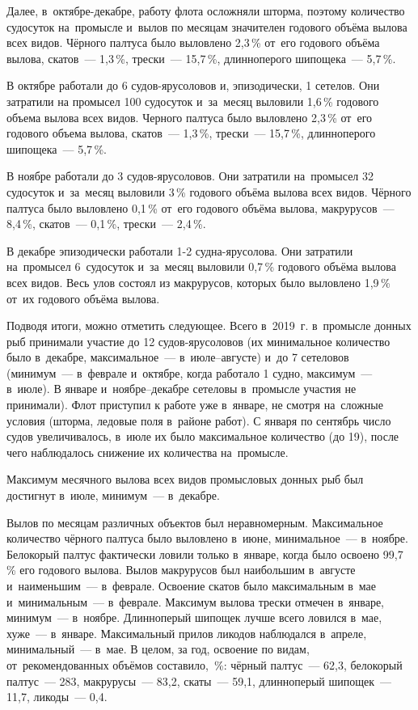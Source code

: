 Далее, в~октябре-декабре, работу флота осложняли шторма, поэтому количество судосуток на~промысле и~вылов по месяцам значителен годового объёма вылова всех видов. Чёрного палтуса было выловлено 2,3\,\% от~его годового объёма вылова, скатов~--- 1,3\,\%, трески~--- 15,7\,\%, длинноперого шипощека~--- 5,7\,\%.

В октябре работали до 6 судов-ярусоловов и, эпизодически, 1 сетелов. Они затратили на промысел 100 судосуток и~за~месяц выловили 1,6\,\% годового объема вылова всех видов. Черного палтуса было выловлено 2,3\,\% от~его годового объема вылова, скатов~--- 1,3\,\%, трески~--- 15,7\,\%, длинноперого шипощека~--- 5,7\,\%.

В ноябре работали до 3 судов-ярусоловов. Они затратили на~промысел 32 судосуток и~за~месяц выловили 3\,\% годового объёма вылова всех видов. Чёрного палтуса было выловлено 0,1\,\% от~его годового объёма вылова, макрурусов~--- 8,4\,\%, скатов~--- 0,1\,\%, трески~--- 2,4\,\%.

В декабре эпизодически работали 1-2 судна-ярусолова. Они затратили на~промысел 6~судосуток и~за~месяц выловили 0,7\,\% годового объёма вылова всех видов. Весь улов состоял из макрурусов, которых было выловлено 1,9\,\% от~их годового объёма вылова.

Подводя итоги, можно отметить следующее. Всего в~2019~г. в~промысле донных рыб принимали участие до 12 судов-ярусоловов (их минимальное количество было в~декабре, максимальное~--- в~июле--августе) и~до 7 сетеловов (минимум~--- в~феврале и~октябре, когда работало 1 судно, максимум~--- в~июле). В январе и~ноябре--декабре сетеловы в~промысле участия не принимали). Флот приступил к работе уже в~январе, не смотря на~сложные условия (шторма, ледовые поля в~районе работ). С января по сентябрь число судов увеличивалось, в~июле их было максимальное количество (до 19), после чего наблюдалось снижение их количества на~промысле.

Максимум месячного вылова всех видов промысловых донных рыб был достигнут в~июле, минимум~--- в~декабре.

Вылов по месяцам различных объектов был неравномерным. Максимальное количество чёрного палтуса было выловлено в~июне, минимальное~--- в~ноябре. Белокорый палтус фактически ловили только в~январе, когда было освоено 99,7\,\% его годового вылова. Вылов макрурусов был наибольшим в~августе и~наименьшим~--- в~феврале. Освоение скатов было максимальным в~мае и~минимальным~--- в~феврале. Максимум вылова трески отмечен в~январе, минимум~--- в~ноябре. Длинноперый шипощек лучше всего ловился в~мае, хуже~--- в~январе. Максимальный прилов ликодов наблюдался в~апреле, минимальный~--- в~мае.
\clearpage
В целом, за год, освоение по видам, от~рекомендованных объёмов составило,~\%: чёрный палтус~--- 62,3, белокорый палтус~--- 283, макрурусы~--- 83,2, скаты~--- 59,1, длинноперый шипощек~--- 11,7, ликоды~--- 0,4.

